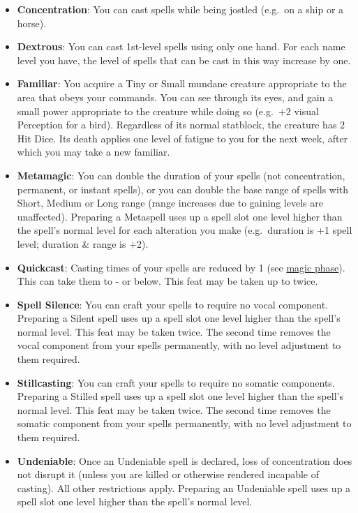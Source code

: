 \documentclass{article}
\begin{document}
\begin{multicols}{2}
\begin{itemize}
\tightlist
\item
  \textbf{Concentration}: You can cast spells while being jostled
  (e.g.~on a ship or a horse).
\item
  \textbf{Dextrous}: You can cast 1st-level spells using only one hand.
  For each name level you have, the level of spells that can be cast in
  this way increase by one.
\item
  \textbf{Familiar}: You acquire a Tiny or Small mundane creature
  appropriate to the area that obeys your commands. You can see through
  its eyes, and gain a small power appropriate to the creature while
  doing so (e.g.~+2 visual Perception for a bird). Regardless of its
  normal statblock, the creature has 2 Hit Dice. Its death applies one
  level of fatigue to you for the next week, after which you may take a
  new familiar.
\item
  \textbf{Metamagic}: You can double the duration of your spells (not
  concentration, permanent, or instant spells), or you can double the
  base range of spells with Short, Medium or Long range (range increases
  due to gaining levels are unaffected). Preparing a Metaspell uses up a
  spell slot one level higher than the spell's normal level for each
  alteration you make (e.g.~duration is +1 spell level; duration \&
  range is +2).
\item
  \textbf{Quickcast}: Casting times of your spells are reduced by 1 (see
  \hyperref[combat-phases]{magic phase}). This can take them to - or
  below. This feat may be taken up to twice.
\item
  \textbf{Spell Silence}: You can craft your spells to require no vocal
  component. Preparing a Silent spell uses up a spell slot one level
  higher than the spell's normal level. This feat may be taken twice.
  The second time removes the vocal component from your spells
  permanently, with no level adjustment to them required.
\item
  \textbf{Stillcasting}: You can craft your spells to require no somatic
  components. Preparing a Stilled spell uses up a spell slot one level
  higher than the spell's normal level. This feat may be taken twice.
  The second time removes the somatic component from your spells
  permanently, with no level adjustment to them required.
\item
  \textbf{Undeniable}: Once an Undeniable spell is declared, loss of
  concentration does not disrupt it (unless you are killed or otherwise
  rendered incapable of casting). All other restrictions apply.
  Preparing an Undeniable spell uses up a spell slot one level higher
  than the spell's normal level.
\end{itemize}


\end{multicols}
\end{document}
